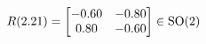 \documentclass[preview]{standalone}
\begin{document}
\begin{align*}
\special{dvisvgm:raw <g id='unique000'>}R(2.21) = \begin{bmatrix} -0.60 & -0.80 \\ 0.80 & -0.60 \end{bmatrix} \in \text{SO}(2)\special{dvisvgm:raw </g>}
\end{align*}
\end{document}
